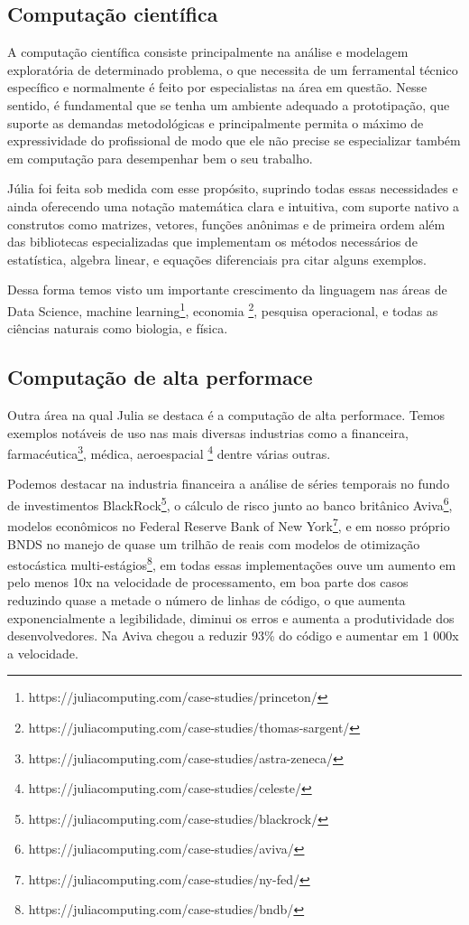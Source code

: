 \subsection{Computação científica}

A computação científica consiste principalmente na análise e modelagem exploratória de determinado problema, o que necessita de um ferramental técnico específico e normalmente é feito por especialistas na área em questão. Nesse sentido, é fundamental que se tenha um ambiente adequado a prototipação, que suporte as demandas metodológicas e principalmente permita o máximo de expressividade do profissional de modo que ele não precise se especializar também em computação para desempenhar bem o seu trabalho. \cite{Kaw2000,Wilson2014,Perez2007}

Júlia foi feita sob medida com esse propósito, suprindo todas essas necessidades e ainda oferecendo uma notação matemática clara e intuitiva, com suporte nativo a construtos como matrizes, vetores, funções anônimas e de primeira ordem além das bibliotecas especializadas que implementam os métodos necessários de estatística, algebra linear, e equações diferenciais pra citar alguns exemplos. \cite{Klok2021}

Dessa forma temos visto um importante crescimento da linguagem nas áreas de Data Science, machine learning\footnote{https://juliacomputing.com/case-studies/princeton/}, 
economia \footnote{https://juliacomputing.com/case-studies/thomas-sargent/}, pesquisa operacional, e todas as ciências naturais como biologia, e física. \cite{Perkel2019,Udell2014}

\subsection{Computação de alta performace}
Outra área na qual Julia se destaca é a computação de alta performace. Temos exemplos notáveis de uso nas mais diversas industrias como a financeira, farmacéutica\footnote{https://juliacomputing.com/case-studies/astra-zeneca/}, médica, aeroespacial \footnote{https://juliacomputing.com/case-studies/celeste/} dentre várias outras. 

Podemos destacar na industria financeira a análise de séries temporais no fundo de investimentos BlackRock\footnote{https://juliacomputing.com/case-studies/blackrock/}, o cálculo de risco junto ao banco britânico Aviva\footnote{https://juliacomputing.com/case-studies/aviva/}, modelos econômicos no Federal Reserve Bank of New York\footnote{https://juliacomputing.com/case-studies/ny-fed/}, e em nosso próprio BNDS no manejo de quase um trilhão de reais com modelos de otimização estocástica multi-estágios\footnote{https://juliacomputing.com/case-studies/bndb/}, em todas essas implementações ouve um aumento em pelo menos 10x na velocidade de processamento, em boa parte dos casos reduzindo quase a metade o número de linhas de código, o que aumenta exponencialmente a legibilidade, diminui os erros e aumenta a produtividade dos desenvolvedores. Na Aviva chegou a reduzir 93\% do código e aumentar em 1 000x a velocidade. 

